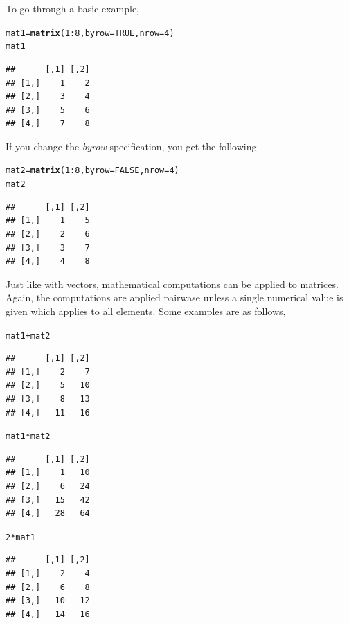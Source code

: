 \documentclass{report}\usepackage[]{graphicx}\usepackage[]{color}
\makeatletter
\newcommand{\hlnum}[1]{\textcolor[rgb]{0.686,0.059,0.569}{#1}}%
\newcommand{\hlopt}[1]{\textcolor[rgb]{0,0,0}{#1}}%
\newcommand{\hlstd}[1]{\textcolor[rgb]{0.345,0.345,0.345}{#1}}%
\newcommand{\hlkwb}[1]{\textcolor[rgb]{0.69,0.353,0.396}{#1}}%
\newcommand{\hlkwc}[1]{\textcolor[rgb]{0.333,0.667,0.333}{#1}}%
\newcommand{\hlkwd}[1]{\textcolor[rgb]{0.737,0.353,0.396}{\textbf{#1}}}%
\newenvironment{kframe}{%
 \def\at@end@of@kframe{}%
 \ifinner\ifhmode%
  \def\at@end@of@kframe{\end{minipage}}%
  \begin{minipage}{\columnwidth}%
 \fi\fi%
 \def\FrameCommand##1{\hskip\@totalleftmargin \hskip-\fboxsep
 \colorbox{shadecolor}{##1}\hskip-\fboxsep
     \hskip-\linewidth \hskip-\@totalleftmargin \hskip\columnwidth}%
 \MakeFramed {\advance\hsize-\width
   \@totalleftmargin\z@ \linewidth\hsize
   \@setminipage}}%
 {\par\unskip\endMakeFramed%
 \at@end@of@kframe}
\newenvironment{knitrout}{}{} %
\makeatother
\begin{document}
To go through a basic example, 
\begin{knitrout}
\color{fgcolor}\begin{kframe}
\begin{alltt}
\hlstd{mat1} \hlkwb{=} \hlkwd{matrix}\hlstd{(}\hlnum{1}\hlopt{:}\hlnum{8}\hlstd{,} \hlkwc{byrow} \hlstd{=} \hlnum{TRUE}\hlstd{,} \hlkwc{nrow} \hlstd{=} \hlnum{4}\hlstd{)}
\hlstd{mat1}
\end{alltt}
\begin{verbatim}
##      [,1] [,2]
## [1,]    1    2
## [2,]    3    4
## [3,]    5    6
## [4,]    7    8
\end{verbatim}
\end{kframe}
\end{knitrout}

If you change the \textit{byrow} specification, you get the following 
\begin{knitrout}
\color{fgcolor}\begin{kframe}
\begin{alltt}
\hlstd{mat2} \hlkwb{=} \hlkwd{matrix}\hlstd{(}\hlnum{1}\hlopt{:}\hlnum{8}\hlstd{,} \hlkwc{byrow} \hlstd{=} \hlnum{FALSE}\hlstd{,} \hlkwc{nrow} \hlstd{=} \hlnum{4}\hlstd{)}
\hlstd{mat2}
\end{alltt}
\begin{verbatim}
##      [,1] [,2]
## [1,]    1    5
## [2,]    2    6
## [3,]    3    7
## [4,]    4    8
\end{verbatim}
\end{kframe}
\end{knitrout}

Just like with vectors, mathematical computations can be applied to matrices.  Again, the computations are applied pairwase unless a single numerical value is given which applies to all elements.  Some examples are as follows, 
\begin{knitrout}
\color{fgcolor}\begin{kframe}
\begin{alltt}
\hlstd{mat1}\hlopt{+}\hlstd{mat2}
\end{alltt}
\begin{verbatim}
##      [,1] [,2]
## [1,]    2    7
## [2,]    5   10
## [3,]    8   13
## [4,]   11   16
\end{verbatim}
\begin{alltt}
\hlstd{mat1}\hlopt{*}\hlstd{mat2}
\end{alltt}
\begin{verbatim}
##      [,1] [,2]
## [1,]    1   10
## [2,]    6   24
## [3,]   15   42
## [4,]   28   64
\end{verbatim}
\begin{alltt}
\hlnum{2}\hlopt{*}\hlstd{mat1}
\end{alltt}
\begin{verbatim}
##      [,1] [,2]
## [1,]    2    4
## [2,]    6    8
## [3,]   10   12
## [4,]   14   16
\end{verbatim}
\end{kframe}
\end{knitrout}
\end{document}
